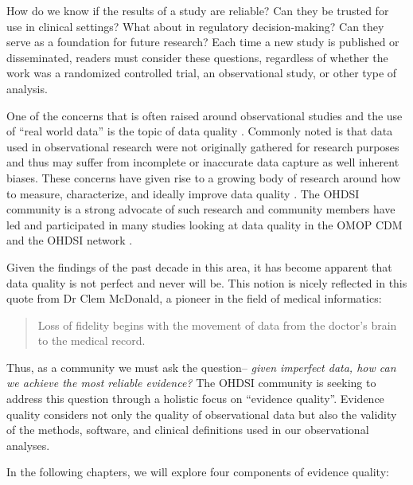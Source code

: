 \documentclass[11pt]{book}
\theoremstyle{definition}
\theoremstyle{definition}
\theoremstyle{definition}
\theoremstyle{remark}
\begin{document}
How do we know if the results of a study are reliable? Can they be trusted for use in clinical settings? What about in regulatory decision-making? Can they serve as a foundation for future research? Each time a new study is published or disseminated, readers must consider these questions, regardless of whether the work was a randomized controlled trial, an observational study, or other type of analysis.

One of the concerns that is often raised around observational studies and the use of ``real world data'' is the topic of data quality \citep{botsis2010secondary, hersh2013caveats, sherman2016real}. Commonly noted is that data used in observational research were not originally gathered for research purposes and thus may suffer from incomplete or inaccurate data capture as well inherent biases. These concerns have given rise to a growing body of research around how to measure, characterize, and ideally improve data quality \citep{kahn2012pragmatic, liaw2013towards, weiskopf2013methods}. The OHDSI community is a strong advocate of such research and community members have led and participated in many studies looking at data quality in the OMOP CDM and the OHDSI network \citep{huser_multisite_2016, kahn_transparent_2015, callahan2017comparison, yoon_2016}.

Given the findings of the past decade in this area, it has become apparent that data quality is not perfect and never will be. This notion is nicely reflected in this quote from Dr Clem McDonald, a pioneer in the field of medical informatics:

\begin{quote}
Loss of fidelity begins with the movement of data from the doctor's brain to the medical record.
\end{quote}

Thus, as a community we must ask the question-- \emph{given imperfect data, how can we achieve the most reliable evidence?} The OHDSI community is seeking to address this question through a holistic focus on ``evidence quality''. Evidence quality considers not only the quality of observational data but also the validity of the methods, software, and clinical definitions used in our observational analyses.

In the following chapters, we will explore four components of evidence quality:
\end{document}
